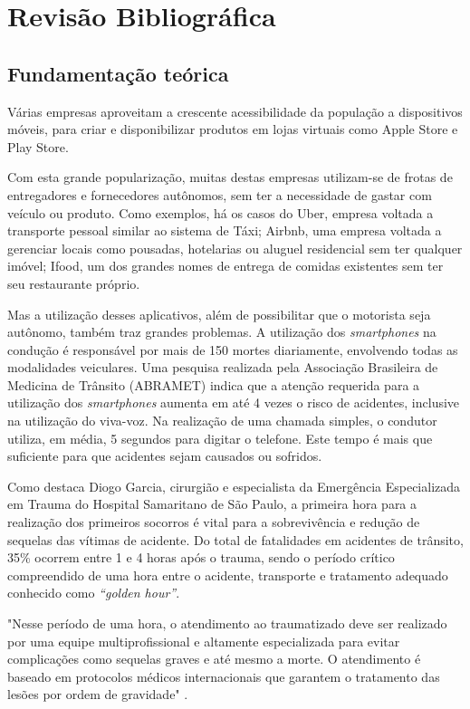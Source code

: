 \chapter{Revisão Bibliográfica} \label{cap:rev}
\section{Fundamentação teórica} 


Várias empresas aproveitam a crescente acessibilidade da população a dispositivos móveis, para criar e disponibilizar produtos em lojas virtuais como Apple Store e Play Store.

Com esta grande popularização, muitas destas empresas utilizam-se de frotas de entregadores e fornecedores autônomos, sem ter a necessidade de gastar com veículo ou produto. Como exemplos, há os casos do Uber, empresa voltada a transporte pessoal similar ao sistema de Táxi; Airbnb, uma empresa voltada a gerenciar locais como pousadas, hotelarias ou aluguel residencial sem ter qualquer imóvel; Ifood, um dos grandes nomes de entrega de comidas existentes sem ter seu restaurante próprio.

Mas a utilização desses aplicativos, além de possibilitar que o motorista seja autônomo, também traz grandes problemas. A utilização dos \textit{smartphones} na condução é responsável por  mais de 150 mortes diariamente, envolvendo todas as modalidades veiculares. Uma pesquisa realizada pela Associação Brasileira de Medicina de Trânsito (ABRAMET) indica que a atenção requerida para a utilização dos \textit{smartphones} aumenta em até 4 vezes o risco de acidentes, inclusive na utilização do viva-voz. Na realização de uma chamada simples, o condutor utiliza, em média, 5 segundos para digitar o telefone. Este tempo é mais que suficiente para que acidentes sejam causados ou sofridos.

Como destaca Diogo Garcia, cirurgião e especialista da Emergência Especializada em Trauma do Hospital Samaritano de São Paulo, a primeira hora para a realização dos primeiros socorros é vital para a sobrevivência e redução de sequelas das vítimas de acidente. Do total de fatalidades em acidentes de trânsito, 35\% ocorrem entre 1 e 4 horas após o trauma, sendo o período crítico compreendido de uma hora entre o acidente, transporte e tratamento adequado conhecido como \textit{“golden hour”}.

\begin{citacao}

        "Nesse período de uma hora, o atendimento ao traumatizado deve ser realizado por uma equipe multiprofissional e altamente especializada para evitar complicações como sequelas graves e até mesmo a morte. O atendimento é baseado em protocolos médicos internacionais que garantem o tratamento das lesões por ordem de gravidade" \cite{lio2019atendimento}. \par

\end{citacao}


